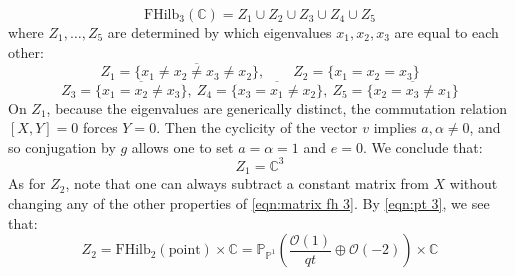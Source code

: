 \documentclass[12pt]{amsart}
\numberwithin{equation}{section}
\theoremstyle{definition}
\theoremstyle{remark}
\newcommand{\CC}{\mathbb{C}}
\newcommand{\PP}{\mathbb{P}}
\newcommand{\CO}{\mathcal{O}}
\renewcommand{\1}{\mathbf{1}}
\newcommand{\FH}{\mathrm{FHilb}}
\newcommand{\point}{\mathrm{point}}
\begin{document}
$$
\FH_3(\CC) = Z_1 \cup Z_2 \cup Z_3 \cup Z_4 \cup Z_5
$$
where $Z_1,\ldots,Z_5$ are determined by which eigenvalues $x_1,x_2,x_3$ are equal to each other:
$$
Z_1 = \overline{\{x_1 \neq x_2 \neq x_3 \neq x_2\}}, \qquad Z_2 = \{x_1=x_2=x_3\}
$$
$$
Z_3 = \overline{\{x_1 = x_2 \neq x_3\}}, \ Z_4 = \overline{\{x_3 = x_1 \neq x_2\}}, \ Z_5 = \overline{\{x_2 = x_3 \neq x_1\}}
$$
On $Z_1$, because the eigenvalues are generically distinct, the commutation relation $[X,Y]=0$ forces $Y=0$. Then the cyclicity of the vector $v$ implies $a,\alpha \neq 0$, and so conjugation by $g$ allows one to set $a = \alpha = 1$ and $e=0$. We conclude that:
\begin{equation}
\label{eqn:z1}
Z_1 = \CC^3
\end{equation}
As for $Z_2$, note that one can always subtract a constant matrix from $X$ without changing any of the other properties of \eqref{eqn:matrix fh 3}. By \eqref{eqn:pt 3}, we see that:
\begin{equation}
\label{eqn:z2}
Z_2 = \FH_2(\point) \times \CC = \PP_{\PP^1} \left( \frac {\CO(1)}{qt} \oplus \CO(-2) \right) \times \CC
\end{equation}
\end{document}
